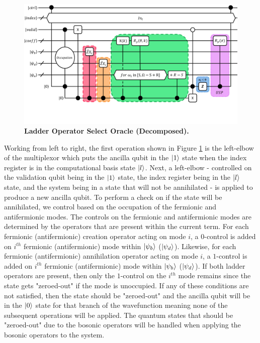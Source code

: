 \begin{figure}
    \centering
    \includegraphics[width=16cm]{figures/select.pdf}
    \caption{\textbf{Ladder Operator Select Oracle (Decomposed).}
    }
    \label{fig:select}
\end{figure}

Working from left to right, the first operation shown in Figure \ref{fig:select} is the left-elbow of the multiplexor which puts the ancilla qubit in the $\ket{1}$ state when the index register is in the computational basis state $\ket{l}$.
Next, a left-elbow - controlled on the validation qubit being in the $\ket{1}$ state, the index register being in the $\ket{l}$ state, and the system being in a state that will not be annihilated - is applied to produce a new ancilla qubit.
To perform a check on if the state will be annihilated, we control based on the occupation of the fermionic and antifermionic modes.
The controls on the fermionic and antifermionic modes are determined by the operators that are present within the current term.
For each fermionic (antifermionic) creation operator acting on mode $i$, a $0$-control is added on $i^{th}$ fermionic (antifermionic) mode within $\ket{\psi_b}$ ($\ket{\psi_d}$).
Likewise, for each fermionic (antifermionic) annihilation operator acting on mode $i$, a $1$-control is added on $i^{th}$ fermionic (antifermionic) mode within $\ket{\psi_b}$ ($\ket{\psi_d}$).
If both ladder operators are present, then only the $1$-control on the $i^{th}$ mode remains since the state gets "zeroed-out" if the mode is unoccupied.
If any of these conditions are not satisfied, then the state should be "zeroed-out" and the ancilla qubit will be in the $\ket{0}$ state for that branch of the wavefunction meaning none of the subsequent operations will be applied.
The quantum states that should be "zeroed-out" due to the bosonic operators will be handled when applying the bosonic operators to the system.

